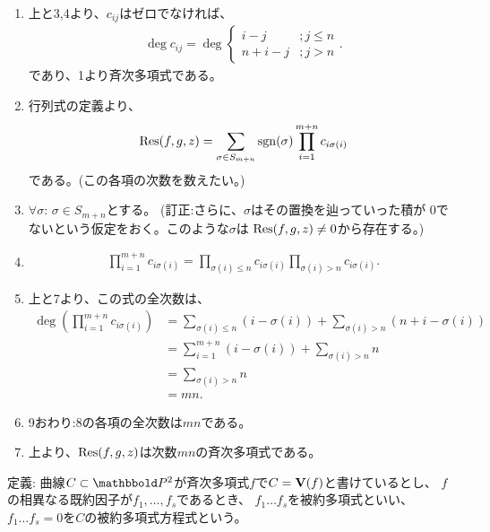 \begin{myproof}
\begin{enumerate}
    )
    \item
    上と3,4より、$c_{ij}$はゼロでなければ、
    \begin{align}
      \deg c_{ij} =  \deg
      \begin{cases}
        i-j &; j \le n\\
        n+i-j &; j>n
      \end{cases}.
    \end{align}
    であり、1より斉次多項式である。
    \item
    行列式の定義より、
    \begin{align}
      \mathrm{Res}(f,g,z) = \sum_{\sigma \in S_{m+n}} \mathrm{sgn}(\sigma) \prod_{i=1}^{m+n}c_{i\sigma(i)}
    \end{align}
    である。(この各項の次数を数えたい。)
    \item $\forall \sigma$: $\sigma \in S_{m+n}$とする。
    (訂正:さらに、$\sigma$はその置換を辿っていった積が
    0でないという仮定をおく。このような$\sigma$は
    $\mathrm{Res}(f,g,z)\neq 0$から存在する。)
    \item
    \begin{align}
      \prod_{i=1}^{m+n} c_{i\sigma(i)} =
      \prod_{\sigma(i)\le n}c_{i\sigma(i)}\prod_{\sigma(i)>n}c_{i\sigma(i)}.
    \end{align}
    \item
    上と7より、この式の全次数は、
    \begin{align}
      \deg(\prod_{i=1}^{m+n} c_{i\sigma(i)})
      &=
      \sum_{\sigma(i)\le n}(i-\sigma(i)) + \sum_{\sigma(i)>n} (n+i-\sigma(i))\\
      &=
      \sum_{i=1}^{m+n}(i-\sigma(i)) + \sum_{\sigma(i)>n}n\\
      &=
      \sum_{\sigma(i)>n}n\\
      &=
      mn.
    \end{align}
    \item
    9おわり:8の各項の全次数は$mn$である。
    \item
    上より、$\mathrm{Res}(f,g,z)$は次数$mn$の斉次多項式である。
  \end{enumerate}
\end{myproof}

\begin{framed}
  定義:
  曲線$C\subset \P^2$が斉次多項式$f$で$C=\textbf V(f)$と書けているとし、
  $f$の相異なる既約因子が$f_1,\dots,f_s$であるとき、
  $f_1\dots f_s$を被約多項式といい、$f_1\dots f_s = 0$を$C$の被約多項式方程式という。
\end{framed}

